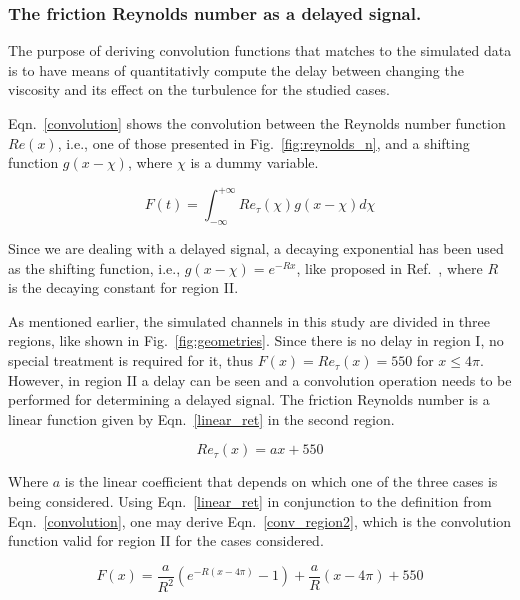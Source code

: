 \documentclass[twocolumn,10pt]{asme2e}
\begin{document}
\subsubsection*{The friction Reynolds number as a delayed signal.} 

The purpose of deriving convolution functions that matches to the simulated data is to have means of quantitativly compute the delay between changing the viscosity and its effect on the turbulence for the studied cases.

Eqn.~\ref{convolution} shows the convolution between the Reynolds number function \(Re(x)\), i.e., one of those presented in Fig.~\ref{fig:reynolds_n}, and a shifting function \(g(x-\chi)\), where \(\chi\) is a dummy variable.

\begin{equation}
F(t) =  \int_{-\infty}^{+\infty} Re_{\tau}(\chi)g(x-\chi)d\chi
\label{convolution}
\end{equation}

Since we are dealing with a delayed signal, a decaying exponential has been used as the shifting function, i.e., \(g(x-\chi)=e^{-Rx}\), like proposed in Ref.~\cite{signals}, where \(R\) is the decaying constant for region II.

As mentioned earlier, the simulated channels in this study are divided in three regions, like shown in Fig.~\ref{fig:geometries}. Since there is no delay in region I, no special treatment is required for it, thus \(F(x)=Re_{\tau}(x)=550\) for \(x{\leq}4\pi\). However, in region II a delay can be seen and a convolution operation needs to be performed for determining a delayed signal. The friction Reynolds number is a linear function given by Eqn.~\ref{linear_ret} in the second region.

\begin{equation}
Re_{\tau}(x)=ax+550
\label{linear_ret}
\end{equation}

Where \(a\) is the linear coefficient that depends on which one of the three cases is being considered. Using Eqn.~\ref{linear_ret} in conjunction to the definition from Eqn.~\ref{convolution}, one may derive Eqn.~\ref{conv_region2}, which is the convolution function valid for region II for the cases considered.

\begin{equation}
F(x)= \frac{a}{R^2}(e^{-R(x-4{\pi})}-1)+\frac{a}{R}(x-4{\pi})+550
\label{conv_region2}
\end{equation}
\end{document}
